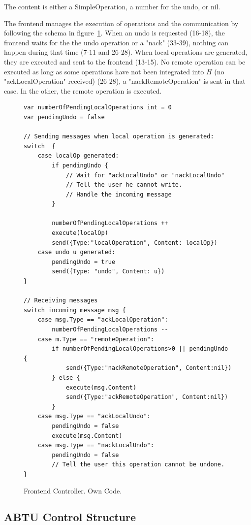 \documentclass[11pt, a4paper, oneside, openright]{article} %
\begin{document}
The content is either a SimpleOperation, a number for the undo, or nil.

The frontend manages the execution of operations and the communication by following the schema in figure~\ref{code:frontend}. When an undo is requested (16-18), the frontend waits for the the undo operation or a "nack" (33-39), nothing can happen during that time (7-11 and 26-28). When local operations are generated, they are executed and sent to the frontend (13-15). No remote operation can be executed as long as some operations have not been integrated into $H$ (no "ackLocalOperation" received) (26-28), a "nackRemoteOperation" is sent in that case. In the other, the remote operation is executed.

\begin{figure}[!h]
\begin{center}
\begin{lstlisting}
var numberOfPendingLocalOperations int = 0
var pendingUndo = false

// Sending messages when local operation is generated:
switch  {
	case localOp generated:
		if pendingUndo {
			// Wait for "ackLocalUndo" or "nackLocalUndo"
			// Tell the user he cannot write.
			// Handle the incoming message
		}
		
		numberOfPendingLocalOperations ++
		execute(localOp)
		send({Type:"localOperation", Content: localOp})
	case undo u generated:
		pendingUndo = true
		send({Type: "undo", Content: u})
}

// Receiving messages
switch incoming message msg {
	case msg.Type == "ackLocalOperation":
		numberOfPendingLocalOperations --
	case m.Type == "remoteOperation":
		if numberOfPendingLocalOperations>0 || pendingUndo {
			send({Type:"nackRemoteOperation", Content:nil})
		} else {
			execute(msg.Content)
			send({Type:"ackRemoteOperation", Content:nil})
		}
	case msg.Type == "ackLocalUndo":
		pendingUndo = false
		execute(msg.Content)
	case msg.Type == "nackLocalUndo":
		pendingUndo = false
		// Tell the user this operation cannot be undone.
}
\end{lstlisting}
\end{center}
\caption{Frontend Controller. Own Code.\label{code:frontend}}
\end{figure}

\subsection{ABTU Control Structure}
\end{document}
